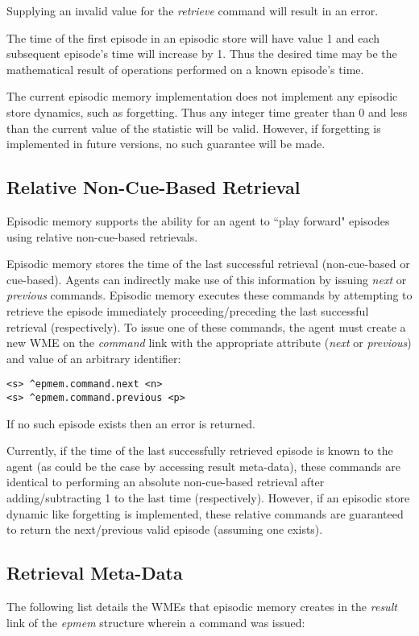Supplying an invalid value for the \emph{retrieve} command will result in an error.

The time of the first episode in an episodic store will have value 1 and each subsequent episode's time will increase by 1.  
Thus the desired time may be the mathematical result of operations performed on a known episode's time.

The current episodic memory implementation does not implement any episodic store dynamics, such as forgetting.  
Thus any integer time greater than 0 and less than the current value of the  statistic will be valid.  
However, if forgetting is implemented in future versions, no such guarantee will be made.

\subsection{Relative Non-Cue-Based Retrieval}
Episodic memory supports the ability for an agent to ``play forward" episodes using relative non-cue-based retrievals. 

Episodic memory stores the time of the last successful retrieval (non-cue-based or cue-based).  
Agents can indirectly make use of this information by issuing \emph{next} or \emph{previous} commands.  
Episodic memory executes these commands by attempting to retrieve the episode immediately proceeding/preceding the last successful retrieval (respectively).  
To issue one of these commands, the agent must create a new WME on the \emph{command} link with the appropriate attribute (\emph{next} or \emph{previous}) and value of an arbitrary identifier:

\begin{verbatim}
<s> ^epmem.command.next <n>
<s> ^epmem.command.previous <p>
\end{verbatim}

If no such episode exists then an error is returned.

Currently, if the time of the last successfully retrieved episode is known to the agent (as could be the case by accessing result meta-data), these commands are identical to performing an absolute non-cue-based retrieval after adding/subtracting 1 to the last time (respectively).  
However, if an episodic store dynamic like forgetting is implemented, these relative commands are guaranteed to return the next/previous valid episode (assuming one exists).

\subsection{Retrieval Meta-Data}
\label{EPMEM-meta}
The following list details the WMEs that episodic memory creates in the \emph{result} link of the \emph{epmem} structure wherein a command was issued:

